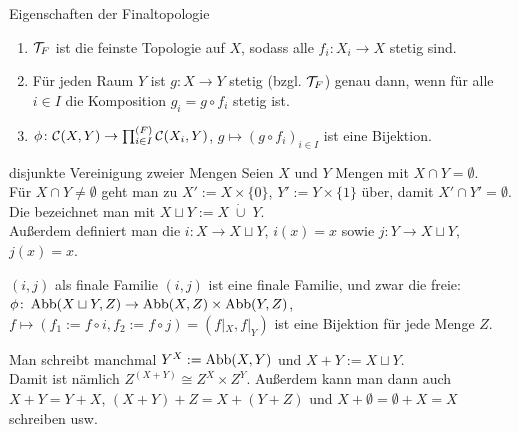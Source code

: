 \begin{Satz}{Eigenschaften der Finaltopologie}
    \begin{enumerate}
        \item
        $\mathcal{T}_F$ ist die feinste Topologie auf $X$, sodass alle
        $f_i\colon X_i \rightarrow X$ stetig sind.
        
        \item
        Für jeden Raum $Y$ ist $g\colon X \rightarrow Y$ stetig (bzgl. $\mathcal{T}_F$)
        genau dann, wenn für alle $i \in I$ die Komposition
        $g_i = g \circ f_i$ stetig ist.
        
        \item
        $\phi\colon \mathcal{C}(X, Y) \rightarrow
        \prod_{i \in I}^{(F)} \mathcal{C}(X_i, Y)$, $g \mapsto (g \circ f_i)_{i \in I}$
        ist eine Bijektion.
    \end{enumerate}
\end{Satz}

\linie

\begin{Def}{disjunkte Vereinigung zweier Mengen}
    Seien $X$ und $Y$ Mengen mit $X \cap Y = \emptyset$. \\
    Für $X \cap Y \not= \emptyset$ geht man zu $X' := X \times \{0\}$,
    $Y' := Y \times \{1\}$ über, damit $X' \cap Y' = \emptyset$. \\
    Die  bezeichnet man mit
    $X \sqcup Y := X \;\dot{\cup}\; Y$. \\
    Außerdem definiert man die 
    $i\colon X \rightarrow X \sqcup Y$, $i(x) = x$
    sowie $j\colon Y \rightarrow X \sqcup Y$, $j(x) = x$.
\end{Def}

\begin{Satz}{$(i, j)$ als finale Familie}
    $(i, j)$ ist eine finale Familie, und zwar die freie: \\
    $\phi\colon \operatorname{Abb}(X \sqcup Y, Z) \rightarrow
    \operatorname{Abb}(X, Z) \times \operatorname{Abb}(Y, Z)$,
    $f \mapsto (f_1 := f \circ i, f_2 := f \circ j) = (f|_X, f|_Y)$
    ist eine Bijektion für jede Menge $Z$.
\end{Satz}

\begin{Bem}
    Man schreibt manchmal $Y^X := \operatorname{Abb}(X, Y)$ und $X + Y := X \sqcup Y$. \\
    Damit ist nämlich $Z^{(X + Y)} \cong Z^X \times Z^Y$.
    Außerdem kann man dann auch $X + Y = Y + X$, $(X + Y) + Z = X + (Y + Z)$
    und $X + \emptyset = \emptyset + X = X$ schreiben usw.
\end{Bem}

